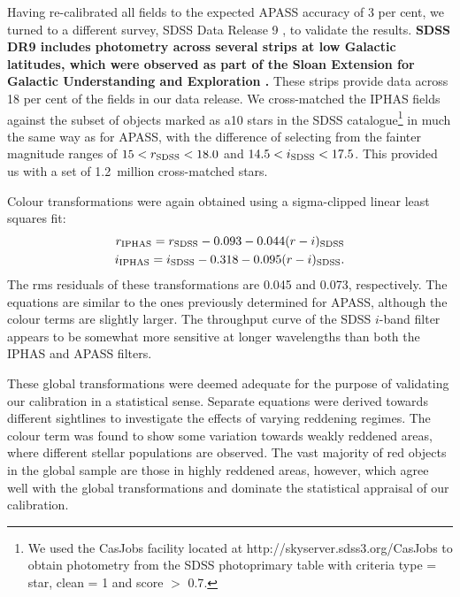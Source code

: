 \documentclass[a4paper,useAMS,usenatbib]{mn2e}
\begin{document}
Having re-calibrated all fields to the expected APASS accuracy of 3 per cent,
we turned to a different survey, SDSS Data Release 9 \citep{Ahn2012},
to validate the results.
{\bf SDSS DR9 includes photometry across several strips at low
Galactic latitudes,
which were observed as part of 
the Sloan Extension for Galactic Understanding and Exploration \citep[SEGUE;][]{segue}.}
These strips provide data across 18 per cent of the fields in our data release.
We cross-matched the IPHAS fields against the subset of
objects marked as a10 stars in the SDSS catalogue\footnote{
We used the CasJobs facility located at http://skyserver.sdss3.org/CasJobs
to obtain photometry from the SDSS {\sc photoprimary} table 
with criteria {\sc type = star}, {\sc clean = 1} and {\sc score $>$ 0.7}.}
in much the same way as for APASS,
with the difference of selecting from the  fainter magnitude ranges of 
$15<r_{\rm SDSS}<18.0$ and $14.5<i_{\rm SDSS}<17.5$.
This provided us with a set of 1.2~million cross-matched stars.

Colour transformations were again obtained using a sigma-clipped linear least squares fit:
\begin{eqnarray}
r_{\rm IPHAS} = r_{\rm SDSS} - 0.093 - 0.044(r-i)_{\rm SDSS} \label{eqn:sdss_r} \\
i_{\rm IPHAS} = i_{\rm SDSS} - 0.318 - 0.095(r-i)_{\rm SDSS}. \label{eqn:sdss_i}
\end{eqnarray}
The rms residuals of these transformations are 0.045 and 0.073, respectively.
The equations are similar to the ones
previously determined for APASS,
although the colour terms are slightly larger.
The throughput curve of the SDSS $i$-band filter 
appears to be somewhat more sensitive at longer wavelengths
than both the IPHAS and APASS filters.

These global transformations were deemed adequate
for the purpose of validating our calibration in a statistical sense.
Separate equations were derived towards different sightlines
to investigate the effects of varying reddening regimes.
The colour term was found 
to show some variation towards weakly reddened areas,
where different stellar populations are observed.
The vast majority of red objects in the global sample
are those in highly reddened areas, however,
which agree well with the global transformations
and dominate the statistical appraisal of our calibration.
\end{document}
